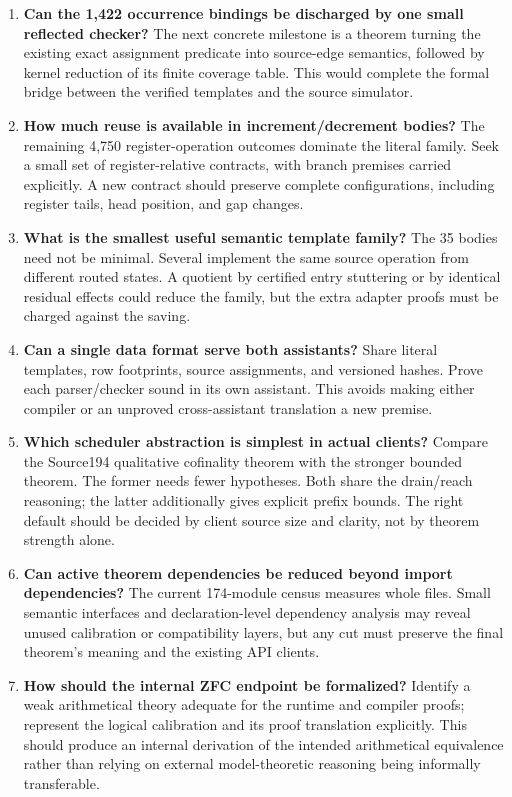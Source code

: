 \documentclass[11pt,letterpaper]{article}
\theoremstyle{definition}
\theoremstyle{remark}
\begin{document}
\begin{enumerate}
\item \textbf{Can the 1,422 occurrence bindings be discharged by one
small reflected checker?} The next concrete milestone is a theorem turning
the existing exact assignment predicate into source-edge semantics, followed
by kernel reduction of its finite coverage table. This would complete the
formal bridge between the verified templates and the source simulator.

\item \textbf{How much reuse is available in increment/decrement bodies?}
The remaining 4,750 register-operation outcomes dominate the literal family.
Seek a small set of register-relative contracts, with branch premises
carried explicitly. A new contract should preserve complete configurations,
including register tails, head position, and gap changes.

\item \textbf{What is the smallest useful semantic template family?}
The 35 bodies need not be minimal. Several implement the same source
operation from different routed states. A quotient by certified entry
stuttering or by identical residual effects could reduce the family, but
the extra adapter proofs must be charged against the saving.

\item \textbf{Can a single data format serve both assistants?} Share
literal templates, row footprints, source assignments, and versioned hashes.
Prove each parser/checker sound in its own assistant. This avoids making
either compiler or an unproved cross-assistant translation a new premise.

\item \textbf{Which scheduler abstraction is simplest in actual clients?}
Compare the Source194 qualitative cofinality theorem with the stronger
bounded theorem. The former needs fewer hypotheses. Both share the drain/reach reasoning;
the latter additionally gives explicit prefix bounds.
The right default should be decided by client source size and clarity,
not by theorem strength alone.

\item \textbf{Can active theorem dependencies be reduced beyond import
dependencies?} The current 174-module census measures whole files. Small
semantic interfaces and declaration-level dependency analysis may reveal
unused calibration or compatibility layers, but any cut must preserve
the final theorem's meaning and the existing API clients.

\item \textbf{How should the internal ZFC endpoint be formalized?}
Identify a weak arithmetical theory adequate for the runtime and compiler
proofs; represent the logical calibration and its proof translation
explicitly. This should produce an internal derivation of the intended
arithmetical equivalence rather than relying on external model-theoretic
reasoning being informally transferable.
\end{enumerate}
\end{document}
